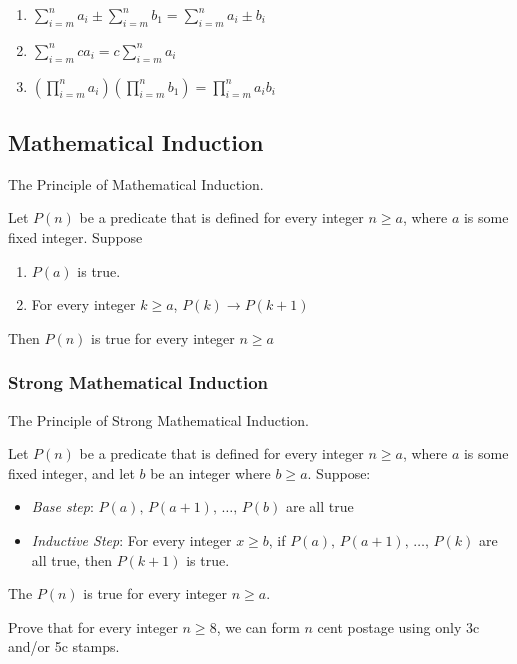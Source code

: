 \begin{enumerate}
    \item $\displaystyle\sum_{i=m}^n a_i \pm \sum_{i=m}^n b_1 = \sum_{i=m}^n a_i \pm b_i$
    \item $\displaystyle\sum_{i=m}^n ca_i = c\sum_{i=m}^n a_i$
    \item $\displaystyle\left(\prod_{i=m}^n a_i\right)\left(\prod_{i=m}^n b_1\right) = \prod_{i=m}^n a_ib_i$
\end{enumerate}

\subsection{Mathematical Induction}
\begin{definition}
    The Principle of Mathematical Induction.

    Let $P(n)$ be a predicate that is defined for every integer $n\geq a$, where $a$ is some fixed integer. Suppose \begin{enumerate}
        \item $P(a)$ is true.
        \item For every integer $k\geq a$, $P(k)\rightarrow P(k+1)$
    \end{enumerate}
    Then $P(n)$ is true for every integer $n\geq a$
\end{definition}

\subsubsection{Strong Mathematical Induction}
\begin{definition}
	The Principle of Strong Mathematical Induction.

	Let $P(n)$ be a predicate that is defined for every integer $n\geq a$, where $a$ is some fixed integer, and let $b$ be an integer where $b\geq a$. Suppose:
	\begin{itemize}
		\item \emph{Base step}: $P(a),\,P(a+1),\,\dots,\,P(b)$ are all true
		\item \emph{Inductive Step}: For every integer $x \geq b$, if $P(a), \, P(a + 1),\,\dots,\, P(k)$ are all true, then $P(k+1)$ is true.
	\end{itemize}
	The $P(n)$ is true for every integer $n\geq a$.
\end{definition}


Prove that for every integer $n \geq 8$, we can form $n$ cent postage using only 3c and/or 5c stamps.


